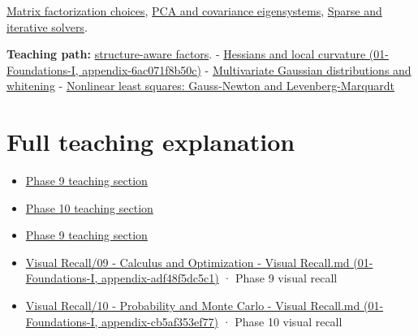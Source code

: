 \hyperref[appendix-221a483bec2d]{Matrix factorization choices}, \hyperref[appendix-ad175ef3c5bf]{PCA and covariance eigensystems}, \hyperref[appendix-67c87a3d9e94]{Sparse and iterative solvers}.

\textbf{Teaching path:} \href{Continuous\%20Notes/Computing\%20Foundations\%20-\%20From\%20Bits\%20to\%20C++\%20and\%20Systems\%20APIs\#Structure\%20makes\%20a\%20decomposition\%20a\%20better\%20tool\%20than\%20generic\%20elimination}{structure-aware factors}. - \href{../01-Foundations-I/main.pdf\#nameddest=appendix-6ac071f8b50c}{Hessians and local curvature (01-Foundations-I, appendix-6ac071f8b50c)} - \hyperref[appendix-12bbe185dbe5]{Multivariate Gaussian distributions and whitening} - \hyperref[appendix-2c2df8345991]{Nonlinear least squares: Gauss-Newton and Levenberg-Marquardt}

\section{Full teaching explanation}\label{appendix-50d2ea3c9b26-full-teaching-explanation}

\begin{itemize}
\tightlist
\item
  \href{Continuous\%20Notes/Computing\%20Foundations\%20-\%20From\%20Bits\%20to\%20C++\%20and\%20Systems\%20APIs\#Jacobians,\%20curvature,\%20and\%20local\%20approximation}{Phase 9 teaching section}
\item
  \href{Continuous\%20Notes/Computing\%20Foundations\%20-\%20From\%20Bits\%20to\%20C++\%20and\%20Systems\%20APIs\#5.\%20Waiting\%20times,\%20event\%20counts,\%20and\%20covariance\%20geometry}{Phase 10 teaching section}
\item
  \href{Continuous\%20Notes/Computing\%20Foundations\%20-\%20From\%20Bits\%20to\%20C++\%20and\%20Systems\%20APIs\#Optimization\%20and\%20inverse\%20problems}{Phase 9 teaching section}
\item
  \href{../01-Foundations-I/main.pdf\#nameddest=appendix-adf48f5dc5c1}{Visual Recall/09 - Calculus and Optimization - Visual Recall.md (01-Foundations-I, appendix-adf48f5dc5c1)} · Phase 9 visual recall
\item
  \href{../01-Foundations-I/main.pdf\#nameddest=appendix-cb5af353ef77}{Visual Recall/10 - Probability and Monte Carlo - Visual Recall.md (01-Foundations-I, appendix-cb5af353ef77)} · Phase 10 visual recall
\end{itemize}
